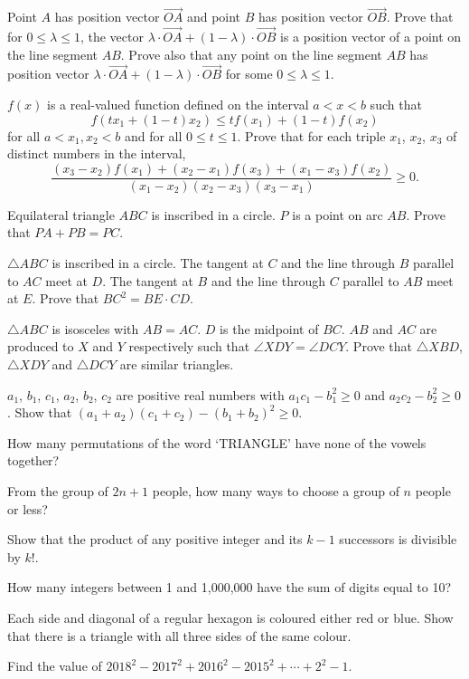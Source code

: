 \begin{problems}
    \problem Point $A$ has position vector $\overrightarrow{OA}$ and point $B$
    has position vector $\overrightarrow{OB}$. Prove that for $0\leq \lambda
    \leq 1$, the vector $\lambda \cdot \overrightarrow{OA} + (1 - \lambda)
    \cdot \overrightarrow{OB}$ is a position vector of a point on the line
    segment $AB$. Prove also that any point on the line segment $AB$ has
    position vector $\lambda \cdot \overrightarrow{OA} + (1 - \lambda) \cdot
    \overrightarrow{OB}$ for some $0\leq \lambda \leq 1$. 
    
    \problem $f(x)$ is a real-valued function defined on the interval $a < x <
    b$ such that 
    \[f(tx_{1} + (1 - t)x_{2}) \leq tf(x_{1}) + (1 - t)f(x_{2})\] 
    for all $a < x_{1}, x_{2} < b$ and for all $0 \leq t \leq 1$. Prove that
    for each triple $x_1$, $x_2$, $x_3$ of distinct numbers in the interval, 
    \[\frac{(x_{3} - x_{2})f(x_{1}) + (x_{2} - x_{1})f(x_{3}) + (x_{1} -
    x_{3})f(x_{2})}{(x_{1} - x_{2})(x_{2} - x_{3})(x_{3} - x_{1})}\geq 0.\]
    
    \problem Equilateral triangle $ABC$ is inscribed in a circle. $P$ is a
    point on arc $AB$. Prove that $PA + PB = PC$. 
    
    \problem $\triangle ABC$ is inscribed in a circle. The tangent at $C$ and
    the line through $B$ parallel to $AC$ meet at $D$. The tangent at $B$ and
    the line through $C$ parallel to $AB$ meet at $E$. Prove that $BC^2 = BE
    \cdot CD$. 
    
    \problem $\triangle ABC$ is isosceles with $AB = AC$. $D$ is the midpoint
    of $BC$. $AB$ and $AC$ are produced to $X$ and $Y$ respectively such that
    $\angle XDY = \angle DCY$. Prove that $\triangle XBD$, $\triangle XDY$ and
    $\triangle DCY$ are similar triangles. 
    
    \problem $a_{1}$, $b_{1}$, $c_{1}$, $a_{2}$, $b_{2}$, $c_{2}$ are positive
    real numbers with $a_{1}c_{1} - b_{1}^2 \geq 0$ and $a_{2}c_{2} - b_{2}^2
    \geq 0$. Show that $(a_{1} + a_{2})(c_{1} + c_{2}) - (b_{1} + b_{2})^2 \geq
    0$. 
    
    \problem How many permutations of the word `TRIANGLE' have none of the
    vowels together?
    
    \problem From the group of $2n + 1$ people, how many ways to choose a group
    of $n$ people or less?
    
    \problem Show that the product of any positive integer and its $k - 1$
    successors is divisible by $k!$. 
    
    \problem How many integers between 1 and 1,000,000 have the sum of digits
    equal to 10?
    
    \problem Each side and diagonal of a regular hexagon is coloured either red
    or blue. Show that there is a triangle with all three sides of the same
    colour. 
    
    \problem Find the value of $2018^2 - 2017^2 + 2016^2 - 2015^2 + \cdots +
    2^2 - 1$.
\end{problems}
